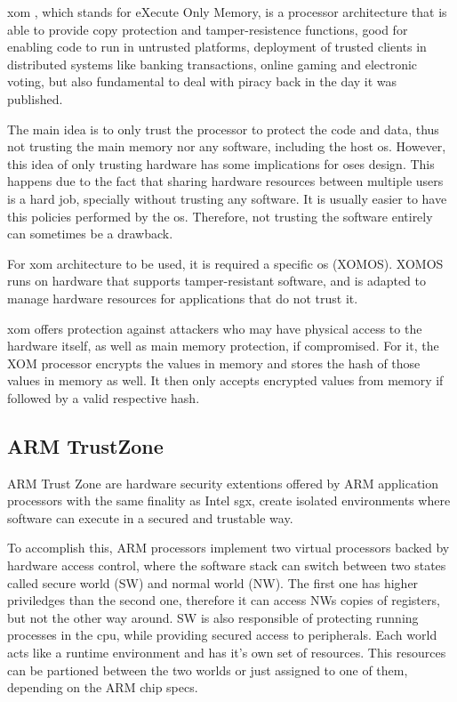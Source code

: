 \gls{xom} \cite{xomPaper}, which stands for eXecute Only Memory, is a processor architecture that is able to provide copy protection and tamper-resistence functions, 
good for enabling code to run in untrusted platforms, deployment of trusted clients in distributed systems like banking transactions, online gaming and electronic voting, but also fundamental to deal with piracy back in the day it was published. 

The main idea is to only trust the processor to protect the code and data, thus not trusting the main memory nor any software, including the host \gls{os}.
However, this idea of only trusting hardware has some implications for \gls{os}es design. This happens due to the fact that sharing hardware resources between multiple users is a hard job, specially without trusting any software. It is usually easier to have this policies performed by the \gls{os}. Therefore, not trusting the software entirely can sometimes be a drawback.  

For \gls{xom} architecture to be used, it is required a specific \gls{os} (XOMOS). XOMOS runs on hardware that supports tamper-resistant software, and is adapted to manage hardware resources for applications that do not trust it.

\gls{xom} offers protection against attackers who may have physical access to the hardware itself, as well as main memory protection, if compromised. For it, the XOM processor encrypts the values in memory and stores the hash of those values in memory as well. It then only accepts encrypted values from memory if followed by a valid respective hash. 



\subsection{ARM TrustZone}
\label{ssec:armtz}

ARM Trust Zone \cite{armTZPaper} are hardware security extentions offered by ARM application processors with the same finality as Intel \gls{sgx}, create isolated environments where software can execute in a secured and trustable way. 

To accomplish this, ARM processors implement two virtual processors backed by hardware access control, where the software stack can switch between two states called secure world (SW) and normal world (NW). 
The first one has higher priviledges than the second one, therefore it can access NWs copies of registers, but not the other way around. SW is also responsible of protecting running processes in the \gls{cpu}, while providing secured access to peripherals. 
Each world acts like a runtime environment and has it's own set of resources. This resources can be partioned between the two worlds or just assigned to one of them, depending on the ARM chip specs.

